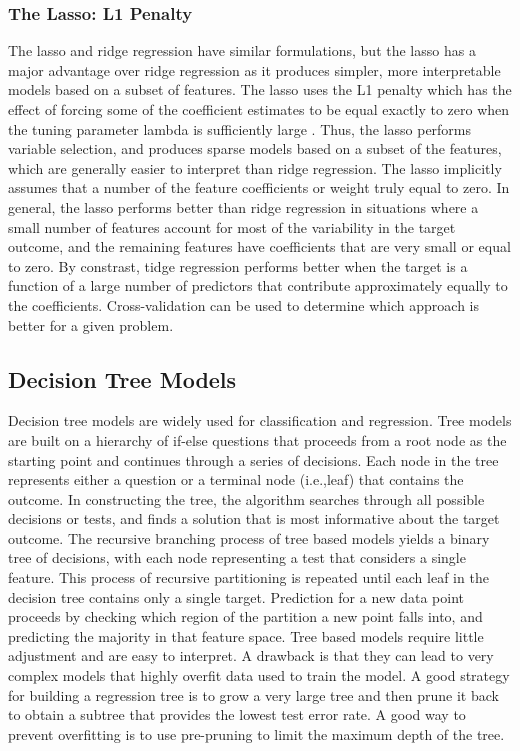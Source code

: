 \documentclass[sigconf]{acmart}
\begin{document}

\subsubsection{The Lasso: L1 Penalty} 

The lasso and ridge regression have similar formulations, but the lasso has 
a major advantage over ridge regression as it produces simpler, more 
interpretable models based on a subset of features. The lasso uses the L1 
penalty which has the effect of forcing some of the coefficient estimates to be
equal exactly to zero when the tuning parameter lambda is sufficiently large 
\cite{statlearn13}. Thus, the lasso performs variable selection, and produces 
sparse models based on a subset of the features, which are generally easier to 
interpret than ridge regression. The lasso implicitly assumes that a number of 
the feature coefficients or weight truly equal to zero. In general, the lasso 
performs better than ridge regression in situations where a small number of 
features account for most of the variability in the target outcome, and the 
remaining features have coefficients that are very small or equal to zero. 
By constrast, tidge regression performs better when the target is a function 
of a large number of predictors that contribute approximately equally to the
coefficients. Cross-validation can be used to determine which approach is 
better for a given problem. 


\subsection{Decision Tree Models}

Decision tree models are widely used for classification and regression. Tree 
models are built on a hierarchy of if-else questions that proceeds from a root 
node as the starting point and continues through a series of decisions. 
Each node in the tree represents either a question or a terminal node 
(i.e.,leaf) that contains the outcome. In constructing the tree, the algorithm 
searches through all possible decisions or tests, and finds a solution that 
is most informative about the target outcome. The recursive branching process 
of tree based models yields a binary tree of decisions, with each node 
representing a test that considers a single feature. This process of recursive 
partitioning is repeated until each leaf in the decision tree contains only a 
single target. Prediction for a new data point proceeds by checking which region
of the partition a new point falls into, and predicting the majority in that 
feature space. Tree based models require little adjustment and are easy to 
interpret. A drawback is that they can lead to very complex models that highly 
overfit data used to train the model. A good strategy for building a regression 
tree is to grow a very large tree and then prune it back to obtain a subtree 
that provides the lowest test error rate. A good way to prevent overfitting 
is to use pre-pruning to limit the maximum depth of the tree. 
\end{document}
